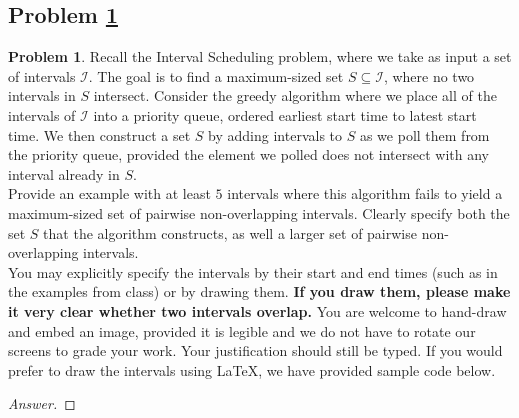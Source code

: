 \documentclass[11pt]{article}
\theoremstyle{definition}
\theoremstyle{definition}
\newtheorem{required}{Problem}
\theoremstyle{definition}
\newcommand{\interval}[4]{\draw (#2, #1) -- (#3, #1); %
\draw (#2, #1-0.11) -- (#2, #1+0.11); %
\draw (#3, #1-0.11) -- (#3, #1+0.11); %
\node[] at (#2-0.25, #1) {#4};
}
\begin{document}
\subsection{Problem \ref{GreedyFail1}}
\begin{required} \label{GreedyFail1}
Recall the \textsf{Interval Scheduling} problem, where we take as input a set of intervals $\mathcal{I}$. The goal is to find a maximum-sized set $S \subseteq \mathcal{I}$, where no two intervals in $S$ intersect. Consider the greedy algorithm where we place all of the intervals of $\mathcal{I}$ into a priority queue, ordered earliest start time to latest start time. We then construct a set $S$ by adding intervals to $S$ as we poll them from the priority queue, provided the element we polled does not intersect with any interval already in $S$. \\

\noindent Provide an example with at least $5$ intervals where this algorithm fails to yield a maximum-sized set of pairwise non-overlapping intervals. Clearly specify both the set $S$ that the algorithm constructs, as well a larger set of pairwise non-overlapping intervals. \\

\noindent You may explicitly specify the intervals by their start and end times (such as in the examples from class) or by drawing them. \textbf{If you draw them, please make it very clear whether two intervals overlap.} You are welcome to hand-draw and embed an image, provided it is legible and we do not have to rotate our screens to grade your work. Your justification should still be typed. If you would prefer to draw the intervals using \LaTeX, we have provided sample code below.
\end{required}



\begin{proof}[Answer]
\end{proof}






\newpage
\end{document}
